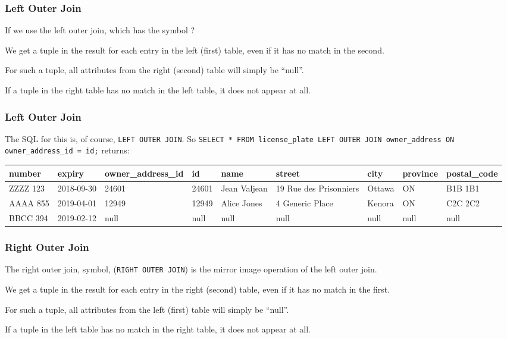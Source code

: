 \begin{frame}
\frametitle{Left Outer Join}

If we use the left outer join, which has the symbol {\tiny {}}? 

We get a tuple in the result for each entry in the left (first) table, even if it has no match in the second. 

For such a tuple, all attributes from the right (second) table will simply be ``null''. 

If a tuple in the right table has no match in the left table, it does not appear at all.


\end{frame}



\begin{frame}
\frametitle{Left Outer Join}

The SQL for this is, of course, \texttt{LEFT OUTER JOIN}. So \texttt{SELECT * FROM license\_plate LEFT OUTER JOIN owner\_address ON owner\_address\_id = id;} returns:

{\tiny
\begin{center}
	\begin{tabular}{|l|l|l|l|l|l|l|l|l|}\hline
		\textbf{number} & \textbf{expiry} & \textbf{owner\_address\_id} & \textbf{id} & \textbf{name} &\textbf{street} & \textbf{city} & \textbf{province} & \textbf{postal\_code} \\ \hline
		ZZZZ 123 & 2018-09-30 & 24601 & 24601 & Jean Valjean & 19 Rue des Prisonniers & Ottawa & ON & B1B 1B1\\ \hline
		AAAA 855 & 2019-04-01 & 12949 & 12949 & Alice Jones & 4 Generic Place & Kenora & ON & C2C 2C2\\ \hline
		BBCC 394 & 2019-02-12 & null & null & null & null & null & null & null \\ \hline
	\end{tabular}
\end{center}
}


\end{frame}



\begin{frame}
\frametitle{Right Outer Join}


The right outer join, symbol, {\tiny {}} (\texttt{RIGHT OUTER JOIN}) is the mirror image operation of the left outer join. 

We get a tuple in the result for each entry in the right (second) table, even if it has no match in the first. 

For such a tuple, all attributes from the left (first) table will simply be ``null''. 

If a tuple in the left table has no match in the right table, it does not appear at all.


\end{frame}




